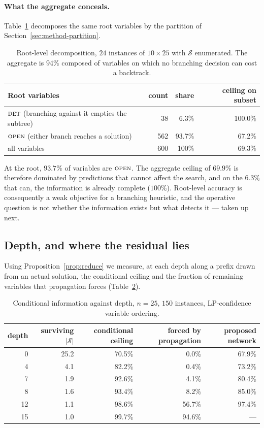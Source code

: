 \documentclass[11pt]{article}
\newcommand{\SOL}{\mathcal{S}}
\newcommand{\FORCED}{\textsc{det}}
\newcommand{\FREE}{\textsc{open}}
\begin{document}
\paragraph{What the aggregate conceals.} Table~\ref{tab:rootsplit} decomposes the same root variables by the partition of Section~\ref{sec:method-partition}.

\begin{table}[h]
\centering
\begin{tabular}{lrrr}
\toprule
Root variables & count & share & ceiling on subset \\
\midrule
$\FORCED$ (branching against it empties the subtree) & 38 & 6.3\% & 100.0\% \\
$\FREE$ (either branch reaches a solution) & 562 & 93.7\% & 67.2\% \\
\midrule
all variables & 600 & 100\% & 69.3\% \\
\bottomrule
\end{tabular}
\caption{Root-level decomposition, $24$ instances of $10\times25$ with $\SOL$ enumerated. The aggregate is $94\%$ composed of variables on which no branching decision can cost a backtrack.}
\label{tab:rootsplit}
\end{table}

At the root, $93.7\%$ of variables are $\FREE$. The aggregate ceiling of $69.9\%$ is therefore dominated by predictions that cannot affect the search, and on the $6.3\%$ that can, the information is already complete ($100\%$). Root-level accuracy is consequently a weak objective for a branching heuristic, and the operative question is not whether the information exists but what detects it --- taken up next.

\subsection{Depth, and where the residual lies}
\label{sec:exp-residual}

Using Proposition~\ref{prop:reduce} we measure, at each depth along a prefix drawn from an actual solution, the conditional ceiling and the fraction of remaining variables that propagation forces (Table~\ref{tab:depth}).

\begin{table}[h]
\centering
\begin{tabular}{rrrrr}
\toprule
depth & surviving $|\SOL|$ & conditional ceiling & forced by propagation & proposed network \\
\midrule
0 & 25.2 & 70.5\% & 0.0\% & 67.9\% \\
4 & 4.1 & 82.2\% & 0.4\% & 73.2\% \\
7 & 1.9 & 92.6\% & 4.1\% & 80.4\% \\
8 & 1.6 & 93.4\% & 8.2\% & 85.0\% \\
12 & 1.1 & 98.6\% & 56.7\% & 97.4\% \\
15 & 1.0 & 99.7\% & 94.6\% & --- \\
\bottomrule
\end{tabular}
\caption{Conditional information against depth, $n=25$, $150$ instances, LP-confidence variable ordering.}
\label{tab:depth}
\end{table}
\end{document}
